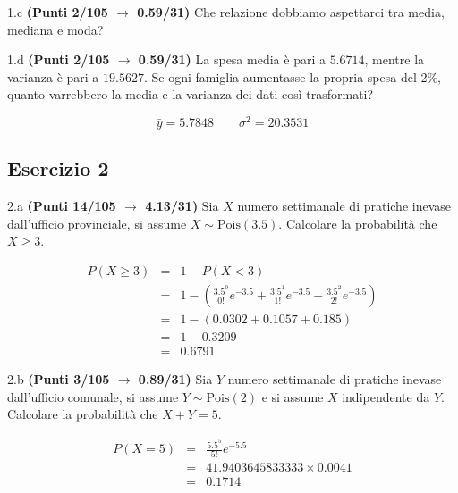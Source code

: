 \documentclass[
  11pt,
]{book}
\theoremstyle{mytheoremstyle}
\theoremstyle{mydefstyle}
\newenvironment{sol}
  {
  \begin{tcolorbox}[enhanced,breakable,arc=0.1mm,boxrule=1pt,colback=white,colframe=iblue,
  title=\bf \fontfamily{lmss}\selectfont \hspace{.5 cm} Soluzione,drop fuzzy shadow]

}{
\end{tcolorbox}
  }
\begin{document}
1.c \textbf{(Punti 2/105 \(\rightarrow\) 0.59/31)} Che relazione dobbiamo aspettarci tra media, mediana e moda?

1.d \textbf{(Punti 2/105 \(\rightarrow\) 0.59/31)} La spesa media è pari a \(5.6714\), mentre la varianza è pari a \(19.5627\).
Se ogni famiglia aumentasse la propria spesa del 2\%, quanto varrebbero la media e la varianza dei dati così trasformati?

\begin{sol}
\[
\bar y = 5.7848\qquad \sigma^2 = 20.3531
\]

\end{sol}

\subsection{Esercizio 2}\label{esercizio-2-36}

2.a \textbf{(Punti 14/105 \(\rightarrow\) 4.13/31)} Sia \(X\) numero settimanale di pratiche inevase dall'ufficio provinciale, si assume \(X\sim\text{Pois}(3.5)\). Calcolare la probabilità che \(X\geq 3\).

\begin{sol}
\begin{eqnarray*}
   P( X \geq 3 ) &=& 1-P( X < 3 ) \\                 &=& 1-\left( \frac{ 3.5 ^{ 0 }}{ 0 !}e^{- 3.5 }+\frac{ 3.5 ^{ 1 }}{ 1 !}e^{- 3.5 }+\frac{ 3.5 ^{ 2 }}{ 2 !}e^{- 3.5 } \right)\\                 &=& 1-( 0.0302+0.1057+0.185 )\\                 &=& 1- 0.3209 \\                 &=&   0.6791 
\end{eqnarray*}

\end{sol}

2.b \textbf{(Punti 3/105 \(\rightarrow\) 0.89/31)} Sia \(Y\) numero settimanale di pratiche inevase dall'ufficio comunale, si assume \(Y\sim\text{Pois}(2)\) e si assume \(X\) indipendente da \(Y\). Calcolare la probabilità che \(X+Y=5\).

\begin{sol}
\begin{eqnarray*}
   P( X = 5 )  &=& \frac{ 5.5 ^{ 5 }}{ 5 !}e^{- 5.5 }\\                 &=& 41.9403645833333 \times 0.0041 \\                 &=& 0.1714 
\end{eqnarray*}

\end{sol}
\end{document}

